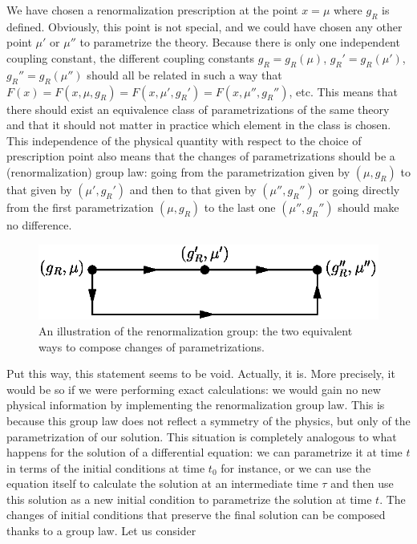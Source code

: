 \documentclass[floatfix,preprintnumbers,amsmath,amssymb,prb,12pt]{revtex4-1}
\begin{document}
We have chosen a renormalization prescription at the point $x=\mu$
where $g_R$ is defined. Obviously, this point is not special, and
we could have chosen any other point
$\mu'$ or $\mu''$ to parametrize the theory. Because there is only
one independent coupling constant, the different coupling constants
$g_R=g_R(\mu)$, $g_R'=g_R(\mu')$, $g_R''=g_R(\mu'')$ should all be
related in such a way that
$F(x)=F(x,\mu,g_R)=F(x,\mu',g_R')=F(x,\mu'',g_R'')$, etc. 
This means that there should exist an equivalence class of
parametrizations of the same theory and that it should not matter
in practice which element in the class is chosen. This independence
of the physical quantity with respect to the choice of
prescription point also means that the changes of parametrizations
should be a (renormalization) group law: going from the 
parametrization given by $(\mu,g_R)$ to that given by
$(\mu',g_R')$ and then to that given by $(\mu'',g_R'')$ or going
directly from the first parametrization $(\mu,g_R)$ to the
last one
$(\mu'',g_R'')$ should make no difference.
\begin{figure}[htbp] 
\begin{center}
\includegraphics[width=.9\linewidth,origin=tl]{diag_RG.eps}\hfill%
\end{center}
\caption{An illustration of the renormalization group: the two equivalent ways to compose changes of parametrizations.}
\label{diagRG}
\end{figure}
Put this way, this statement seems to be 
void. Actually, it is. More precisely, it would be so if
we were performing exact calculations: we would gain no new
physical information by implementing the renormalization group
law. This is because this group law does not reflect a symmetry
of the physics, but only of the parametrization of our solution.
This situation is completely analogous to what happens for
the solution of a differential equation: we can parametrize it at
time $t$ in terms of the initial conditions at time $t_0$ for
instance, or we can use the equation itself to calculate the
solution at an intermediate time $\tau$ and then use this solution
as a new initial condition to parametrize the solution at time
$t$. The changes of initial conditions that preserve the final
solution can be composed thanks to a group law. Let us consider
\end{document}
